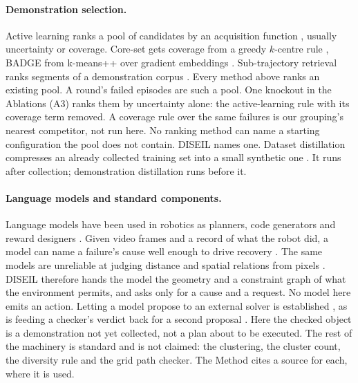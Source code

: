 \paragraph{Demonstration selection.}
Active learning ranks a pool of candidates by an acquisition function
\cite{settles2009active}, usually uncertainty \cite{houlsby2011bald} or coverage.
Core-set gets coverage from a greedy $k$-centre rule \cite{sener2018coreset},
BADGE from k-means++ over gradient embeddings \cite{ash2020badge}. Sub-trajectory
retrieval ranks segments of a demonstration corpus \cite{memmel2025strap}. Every
method above ranks an existing pool. A round's failed episodes are such a pool.
One knockout in the Ablations (A3) ranks them by uncertainty alone: the
active-learning rule with its coverage term removed. A coverage rule over the
same failures is our grouping's nearest competitor, not run here. No
ranking method can name a starting configuration the pool does not contain.
DISEIL names one. Dataset distillation compresses an already collected training
set into a small synthetic one \cite{cazenavette2022mtt}. It runs after
collection; demonstration distillation runs before it.

\paragraph{Language models and standard components.}
Language models have been used in robotics as planners, code generators and
reward designers \cite{ahn2022saycan,liang2023codeaspolicies,ma2024eureka}. Given
video frames and a record of what the robot did, a model can name a failure's
cause well enough to drive recovery \cite{liu2023reflect,duan2025aha}. The same
models are unreliable at judging distance and spatial relations from pixels
\cite{chen2024spatialvlm,fu2024blink}. DISEIL therefore hands the model the
geometry and a constraint graph of what the environment permits, and asks only
for a cause and a request. No model here emits an action. Letting a model propose
to an external solver is established \cite{liu2023llmp}, as is feeding a
checker's verdict back for a second proposal \cite{chen2024autotamp}. Here the
checked object is a demonstration not yet collected, not a plan about to be
executed. The rest of the machinery is standard and is not claimed: the
clustering, the cluster count, the diversity rule and the grid path checker. The
Method cites a source for each, where it is used.
